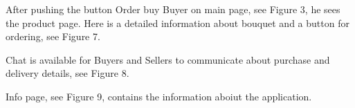 \documentclass{scrreprt}
\begin{document}
\begin{figure}[h]
\begin{minipage}[h]{0.32\linewidth}
	\end{minipage}
\end{figure}

After pushing the button Order buy Buyer on main page, see Figure 3, he sees the product page. Here is a detailed information about bouquet and a button for ordering, see Figure 7.

Chat is available for Buyers and Sellers to communicate about purchase and delivery details, see Figure 8.

Info page, see Figure 9, contains the information aboiut the application.
\end{document}

